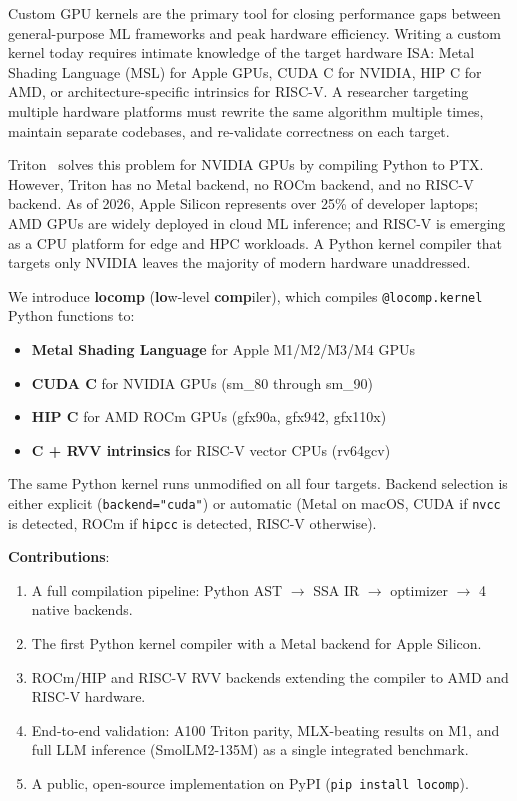 \documentclass[10pt,twocolumn]{article}
\begin{document}
Custom GPU kernels are the primary tool for closing performance gaps between
general-purpose ML frameworks and peak hardware efficiency. Writing a custom
kernel today requires intimate knowledge of the target hardware ISA: Metal
Shading Language (MSL) for Apple GPUs, CUDA C for NVIDIA, HIP C for AMD, or
architecture-specific intrinsics for RISC-V. A researcher targeting multiple
hardware platforms must rewrite the same algorithm multiple times, maintain
separate codebases, and re-validate correctness on each target.

Triton~\cite{triton} solves this problem for NVIDIA GPUs by compiling Python
to PTX. However, Triton has no Metal backend, no ROCm backend, and no RISC-V
backend. As of 2026, Apple Silicon represents over 25\% of developer laptops;
AMD GPUs are widely deployed in cloud ML inference; and RISC-V is emerging as
a CPU platform for edge and HPC workloads. A Python kernel compiler that
targets only NVIDIA leaves the majority of modern hardware unaddressed.

We introduce \textbf{locomp} (\textbf{lo}w-level \textbf{comp}iler), which compiles
\texttt{@locomp.kernel} Python functions to:
\begin{itemize}[noitemsep]
  \item \textbf{Metal Shading Language} for Apple M1/M2/M3/M4 GPUs
  \item \textbf{CUDA C} for NVIDIA GPUs (sm\_80 through sm\_90)
  \item \textbf{HIP C} for AMD ROCm GPUs (gfx90a, gfx942, gfx110x)
  \item \textbf{C + RVV intrinsics} for RISC-V vector CPUs (rv64gcv)
\end{itemize}

The same Python kernel runs unmodified on all four targets. Backend selection
is either explicit (\texttt{backend="cuda"}) or automatic (Metal on macOS,
CUDA if \texttt{nvcc} is detected, ROCm if \texttt{hipcc} is detected, RISC-V
otherwise).

\textbf{Contributions}:
\begin{enumerate}[noitemsep]
  \item A full compilation pipeline: Python AST $\to$ SSA IR $\to$ optimizer
        $\to$ 4 native backends.
  \item The first Python kernel compiler with a Metal backend for Apple Silicon.
  \item ROCm/HIP and RISC-V RVV backends extending the compiler to AMD and
        RISC-V hardware.
  \item End-to-end validation: A100 Triton parity, MLX-beating results on M1,
        and full LLM inference (SmolLM2-135M) as a single integrated benchmark.
  \item A public, open-source implementation on PyPI (\texttt{pip install locomp}).
\end{enumerate}
\end{document}
